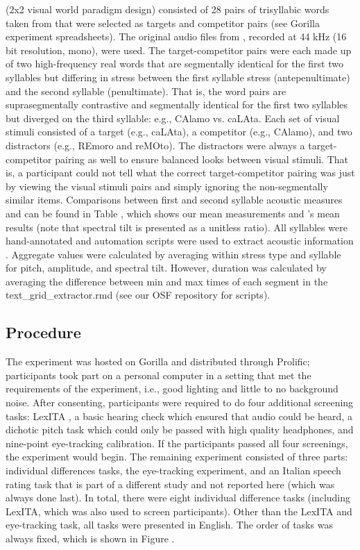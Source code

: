(2x2 visual world paradigm design) consisted of 28 pairs of trisyllabic words taken from  that were selected as targets and competitor pairs (see Gorilla experiment spreadsheets). The original audio files from , recorded at 44 kHz (16 bit resolution, mono), were used. The target-competitor pairs were each made up of two high-frequency real words that are segmentally identical for the first two syllables but differing in stress between the first syllable stress (antepenultimate) and the second syllable (penultimate). That is, the word pairs are suprasegmentally contrastive and segmentally identical for the first two syllables but diverged on the third syllable: e.g., CAlamo vs. caLAta. Each set of visual stimuli consisted of a target (e.g., caLAta), a competitor (e.g., CAlamo), and two distractors (e.g., REmoro and reMOto). The distractors were always a target-competitor pairing as well to ensure balanced looks between visual stimuli. That is, a participant could not tell what the correct target-competitor pairing was just by viewing the visual stimuli pairs and simply ignoring the non-segmentally similar items. Comparisons between first and second syllable acoustic measures and can be found in Table , which shows our mean measurements and 's mean results (note that spectral tilt is presented as a unitless ratio). All syllables were hand-annotated and automation scripts were used to extract acoustic information . Aggregate values were calculated by averaging within stress type and syllable for pitch, amplitude, and spectral tilt. However, duration was calculated by averaging the difference between min and max times of each segment in the text\_grid\_extractor.rmd (see our OSF repository for scripts). 

\subsection{Procedure}

The experiment was hosted on Gorilla and distributed through Prolific; participants took part on a personal computer in a setting that met the requirements of the experiment, i.e., good lighting and little to no background noise. After consenting, participants were required to do four additional screening tasks: LexITA , a basic hearing check which ensured that audio could be heard, a dichotic pitch task  which could only be passed with high quality headphones, and nine-point eye-tracking calibration. If the participants passed all four screenings, the experiment would begin. The remaining experiment consisted of three parts: individual differences tasks, the eye-tracking experiment, and an Italian speech rating task that is part of a different study and not reported here (which was always done last). In total, there were eight individual difference tasks (including LexITA, which was also used to screen participants). Other than the LexITA and eye-tracking task, all tasks were presented in English. The order of tasks was always fixed, which is shown in Figure . 


